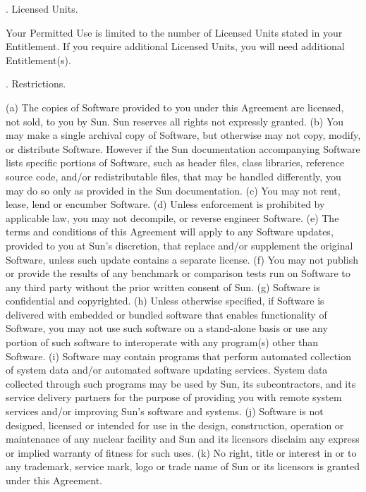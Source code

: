 \bigskip 
\par {}.      Licensed Units.
\bigskip 
\par \noindent Your Permitted Use is limited to the number of Licensed Units stated in your Entitlement. If you require additional Licensed Units, you will need additional Entitlement(s).
\bigskip 
\par {}.      Restrictions.
\bigskip 
\par \noindent (a) The copies of Software provided to you under this Agreement are licensed, not sold, to you by Sun. Sun reserves all rights not expressly granted. (b) You may make a single archival copy of Software, but otherwise may not copy, modify, or distribute Software. However if the Sun documentation accompanying Software lists specific portions of Software, such as header files, class libraries, reference source code, and/or redistributable files, that may be handled differently, you may do so only as provided in the Sun documentation. (c) You may not rent, lease, lend or encumber Software. (d) Unless enforcement is prohibited by applicable law, you may not decompile, or reverse engineer Software. (e) The terms and conditions of this Agreement will apply to any Software updates, provided to you at Sun's discretion, that replace and/or supplement the original Software, unless such update contains a separate license. (f) You may not publish or provide the results of any benchmark or comparison tests run on Software to any third party without the prior written consent of Sun. (g) Software is confidential and copyrighted. (h) Unless otherwise specified, if Software is delivered with embedded or bundled software that enables functionality of Software, you may not use such software on a stand-alone basis or use any portion of such software to interoperate with any program(s) other than Software. (i) Software may contain programs that perform automated collection of system data and/or automated software updating services. System data collected through such programs may be used by Sun, its subcontractors, and its service delivery partners for the purpose of providing you with remote system services and/or improving Sun's software and systems. (j) Software is not designed, licensed or intended for use in the design, construction, operation or maintenance of any nuclear facility and Sun and its licensors disclaim any express or implied warranty of fitness for such uses. (k) No right, title or interest in or to any trademark, service mark, logo or trade name of Sun or its licensors is granted under this Agreement.

